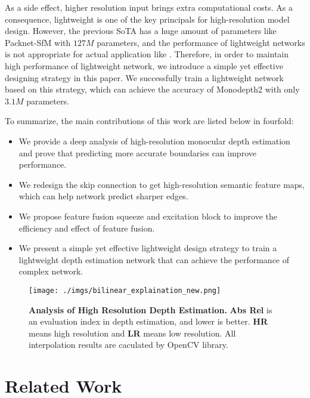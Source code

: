 \documentclass[letterpaper]{article} \usepackage{aaai21}  \usepackage{times}  \usepackage{helvet} \usepackage{courier}  \usepackage[hyphens]{url}  \usepackage{graphicx} \urlstyle{rm} \def\UrlFont{\rm}  \usepackage{natbib}  \usepackage{caption} \frenchspacing  \setlength{\pdfpagewidth}{8.5in}  \setlength{\pdfpageheight}{11in}  \usepackage{booktabs}
\begin{document}
As a side effect, higher resolution input brings extra computational costs. As a consequence, lightweight is one of the key principals for high-resolution model design. However, the previous 
SoTA has a huge amount of parameters like Packnet-SfM with $127M$ parameters, and the performance of lightweight networks is not appropriate for actual application 
like \cite{poggi2018towards}. Therefore, in order to maintain high performance of lightweight network, we introduce a simple yet effective designing strategy in this paper. We successfully 
train a lightweight network based on this strategy, which can achieve the accuracy of Monodepth2 with only $3.1M$ parameters.

To summarize, the main contributions of this work are listed below in fourfold:
\begin{itemize}
    \item We provide a deep analysis of high-resolution monocular depth estimation and prove that predicting more accurate boundaries can improve performance.
    \item We redesign the skip connection to get high-resolution semantic feature maps, which can help network predict sharper edges.
    \item We propose feature fusion squeeze and excitation block to improve the efficiency and effect of feature fusion.
    \item We present a simple yet effective lightweight design strategy to train a lightweight depth estimation network that can achieve the performance of complex network.
\end{itemize}


\begin{figure*}[ht]
    \centering
    \texttt{[image: ./imgs/bilinear\_explaination\_new.png]} 
    \caption{\textbf{Analysis of High Resolution Depth Estimation.}  \textbf{Abs Rel} is an evaluation index in depth estimation, and lower is better. \textbf{HR} means high resolution and \textbf{LR} 
    means low resolution. All interpolation results are caculated by OpenCV library.}
\label{fig2}
\end{figure*}

\section{Related Work}
\end{document}
